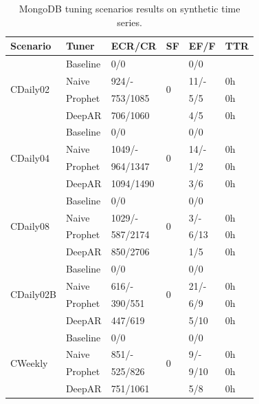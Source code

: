 \documentclass[a4paper, 12pt]{article} %
\newcommand{\ra}[1]{\renewcommand{\arraystretch}{#1}}
\begin{document}
	\begin{table}\centering 
		\ra{1.3}
		\begin{tabularx}{\textwidth}{@{}XXXXXX@{}}
			\toprule
			Scenario & Tuner & ECR/CR & SF & EF/F & TTR\\
			
			\midrule
			\multirow{4}{*}{CDaily02}
			& Baseline & 0/0 & \multirow{4}{*}{0}  & 0/0 & \\
			& Naive & 924/- && 11/- & 0h \\
			& Prophet & 753/1085 && 5/5 & 0h \\
			& DeepAR & 706/1060 && 4/5 & 0h \\
			
			
			\midrule
			\multirow{4}{*}{CDaily04}
			& Baseline & 0/0 & \multirow{4}{*}{0}  & 0/0 & \\
			& Naive & 1049/- && 14/- & 0h \\
			& Prophet & 964/1347 && 1/2 & 0h\\
			& DeepAR & 1094/1490 && 3/6 & 0h \\
			
			\midrule
			\multirow{4}{*}{CDaily08}
			& Baseline & 0/0 & \multirow{4}{*}{0}  & 0/0 & \\
			& Naive & 1029/- && 3/- & 0h \\
			& Prophet & 587/2174 && 6/13 & 0h \\
			& DeepAR & 850/2706 && 1/5 & 0h \\
			
			\midrule
			\multirow{4}{*}{CDaily02B}
			& Baseline & 0/0 & \multirow{4}{*}{0}  & 0/0 & \\
			& Naive & 616/- && 21/- & 0h \\
			& Prophet & 390/551 && 6/9 & 0h \\
			& DeepAR & 447/619 &&5/10 & 0h \\
			
			\midrule
			\multirow{4}{*}{CWeekly}
			& Baseline & 0/0 & \multirow{4}{*}{0}  & 0/0 & \\
			& Naive & 851/- && 9/- & 0h \\
			& Prophet & 525/826 && 9/10 & 0h \\
			& DeepAR & 751/1061 && 5/8 & 0h \\
			
			\bottomrule
		\end{tabularx}
		\caption{MongoDB tuning scenarios results on synthetic time series. } \label{table:results_cassandra_synthetic}
	\end{table}
\end{document}

